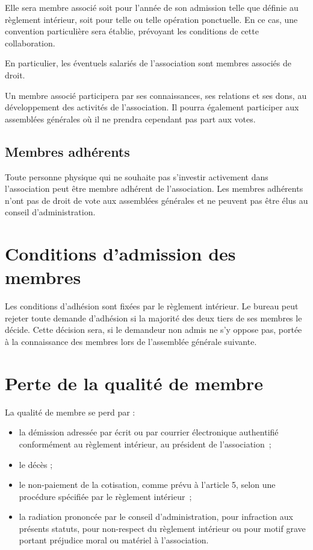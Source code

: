 \documentclass[a4wide,12pt]{scrartcl}
\begin{document}
Elle sera membre associé soit pour l'année de son admission telle que
définie au règlement intérieur, soit pour telle ou telle opération
ponctuelle.  En ce cas, une convention particulière sera établie,
prévoyant les conditions de cette collaboration.

En particulier, les éventuels salariés de l'association sont membres
associés de droit.

Un membre associé participera par ses connaissances, ses relations et
ses dons, au développement des activités de l'association. Il pourra
également participer aux assemblées générales où il ne prendra
cependant pas part aux votes.

\subsection{Membres adhérents}

Toute personne physique qui ne souhaite pas s’investir activement dans
l’association peut être membre adhérent de l’association. Les membres
adhérents n’ont pas de droit de vote aux assemblées générales et ne
peuvent pas être élus au conseil d’administration.

\section{Conditions d'admission des membres}

Les conditions d'adhésion sont fixées par le règlement intérieur. Le
bureau peut rejeter toute demande d'adhésion si la majorité des deux
tiers de ses membres le décide. Cette décision sera, si le demandeur
non admis ne s'y oppose pas, portée à la connaissance des membres lors
de l'assemblée générale suivante.

\section{Perte de la qualité de membre}

La qualité de membre se perd par :
\begin{itemize}
\item la démission adressée par écrit ou par courrier électronique
  authentifié conformément au règlement intérieur, au président de
  l'association~;
\item le décès ;
\item le non-paiement de la cotisation, comme prévu à l'article 5,
  selon une procédure spécifiée par le règlement intérieur~;
\item la radiation prononcée par le conseil d'administration, pour
  infraction aux présents statuts, pour non-respect du règlement
  intérieur ou pour motif grave portant préjudice moral ou matériel à
  l'association.
\end{itemize}
\end{document}

